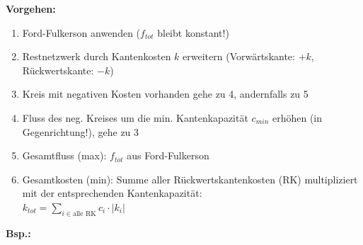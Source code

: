 \textbf{Vorgehen:}
\begin{enumerate}
	\item Ford-Fulkerson anwenden ($f_{tot}$ bleibt konstant!)
	\item Restnetzwerk durch Kantenkosten $k$ erweitern (Vorwärtskante: $+k$, Rückwertskante: $-k$)
	\item Kreis mit negativen Kosten vorhanden gehe zu 4, andernfalls zu 5
	\item Fluss des neg. Kreises um die min. Kantenkapazität $c_{min}$ erhöhen (in Gegenrichtung!), gehe zu 3
	\item Gesamtfluss (max): $f_{tot}$ aus Ford-Fulkerson
	\item Gesamtkosten (min): Summe aller Rückwertskantenkosten (RK) multipliziert mit der entsprechenden Kantenkapazität:\\  
	$k_{tot} = \sum\limits_{ i \in \text{alle RK}} c_i \cdot |k_i| $
\end{enumerate}

\textbf{Bsp.:}

